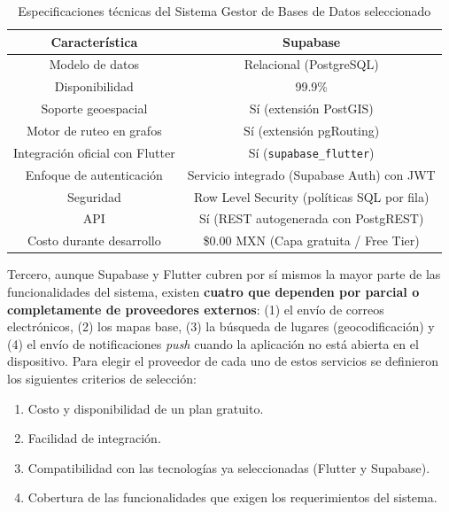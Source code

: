 \begin{table}[htbp]
\centering
\footnotesize
\caption{Especificaciones técnicas del Sistema Gestor de Bases de Datos seleccionado}
\label{tab:especificaciones-dbms}
\begin{tabularx}{\textwidth}{ |C|C| }
\hline
\textbf{Característica} & \textbf{Supabase} \\ \hline
Modelo de datos & Relacional (PostgreSQL) \cite{supabase_arquitectura} \\ \hline
Disponibilidad & 99.9\% \cite{supabase_sla} \\ \hline
Soporte geoespacial & Sí (extensión PostGIS) \cite{supabase_postgis} \\ \hline
Motor de ruteo en grafos & Sí (extensión pgRouting) \cite{supabase_pgrouting} \\ \hline
Integración oficial con Flutter & Sí (\texttt{supabase\_flutter}) \cite{supabase_flutter} \\ \hline
Enfoque de autenticación & Servicio integrado (Supabase Auth) con JWT \cite{supabase_auth} \\ \hline
Seguridad & Row Level Security (políticas SQL por fila) \cite{supabase_seguridad} \\ \hline
API & Sí (REST autogenerada con PostgREST) \cite{supabase_arquitectura} \\ \hline
Costo durante desarrollo & \$0.00 MXN (Capa gratuita / Free Tier) \\ \hline
\end{tabularx}
\end{table}


Tercero, aunque Supabase y Flutter cubren por sí mismos la mayor parte de las funcionalidades del sistema, existen \textbf{cuatro que dependen por parcial o completamente de proveedores externos}: (1) el envío de correos electrónicos, (2) los mapas base, (3) la búsqueda de lugares (geocodificación) y (4) el envío de notificaciones \textit{push} cuando la aplicación no está abierta en el dispositivo. Para elegir el proveedor de cada uno de estos servicios se definieron los siguientes criterios de selección:
\begin{enumerate}
    \item Costo y disponibilidad de un plan gratuito.
    \item Facilidad de integración.
    \item Compatibilidad con las tecnologías ya seleccionadas (Flutter y Supabase).
    \item Cobertura de las funcionalidades que exigen los requerimientos del sistema.
\end{enumerate}

